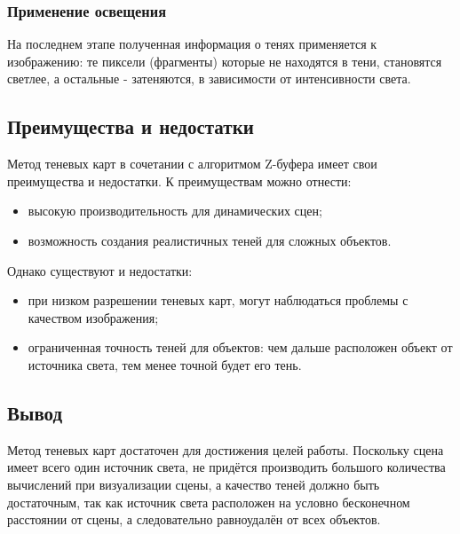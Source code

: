 \subsubsection{Применение освещения} 

На последнем этапе полученная информация о тенях применяется к изображению: те пиксели (фрагменты) которые не находятся в тени, становятся светлее, а остальные - затеняются, в зависимости от интенсивности света.

\subsection{Преимущества и недостатки}

Метод теневых карт в сочетании с алгоритмом Z-буфера имеет свои преимущества и недостатки. К преимуществам можно отнести:

\begin{itemize}
    \item высокую производительность для динамических сцен;
    \item возможность создания реалистичных теней для сложных объектов.
\end{itemize}

Однако существуют и недостатки:

\begin{itemize}
    \item при низком разрешении теневых карт, могут наблюдаться проблемы с качеством изображения;
    \item ограниченная точность теней для объектов: чем дальше расположен объект от источника света, тем менее точной будет его тень.
\end{itemize}

\subsection{Вывод}

Метод теневых карт достаточен для достижения целей работы. Поскольку сцена имеет всего один источник света, не придётся производить большого количества вычислений при визуализации сцены, а качество теней должно быть достаточным, так как источник света расположен на условно бесконечном расстоянии от сцены, а следовательно равноудалён от всех объектов. 
